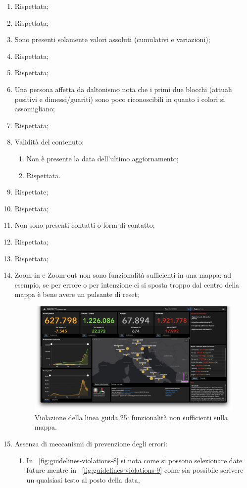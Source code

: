 \begin{enumerate}
    \item Rispettata;
    \item Rispettata;
    \item Sono presenti solamente valori assoluti (cumulativi e variazioni);
    \item Rispettata;
    \item Rispettata;
    \item Una persona affetta da daltonismo nota che i primi due blocchi (attuali positivi e dimessi/guariti) sono poco riconoscibili in quanto i colori si assomigliano;
    \item Rispettata;
    \item Validità del contenuto:
        \begin{enumerate}
            \item Non è presente la data dell'ultimo aggiornamento;
            \item Rispettata.
        \end{enumerate}
    \item Rispettate;
    \item Rispettata;
    \item Non sono presenti contatti o form di contatto;
    \item Rispettata;
    \item Rispettata;
    \item Zoom-in e Zoom-out non sono funzionalità sufficienti in una mappa: ad esempio, se per errore o per intenzione ci si sposta troppo dal centro della mappa è bene avere un pulsante di reset;
        \begin{figure}[h]
            \centering
            \includegraphics[width=0.5\columnwidth]{../../../assets/images/verifica-risorse-esistenti/guidelines_violations_7.png}
            \caption{Violazione della linea guida 25: funzionalità non sufficienti sulla mappa.}
            \label{fig:guidelines-violations-7}
        \end{figure}
    \item Assenza di meccanismi di prevenzione degli errori:
        \begin{enumerate}
            \item In ~\ref{fig:guidelines-violations-8} si nota come si possono selezionare date future mentre in ~\ref{fig:guidelines-violations-9} come sia possibile scrivere un qualsiasi testo al posto della data,


\end{enumerate}
\end{enumerate}
